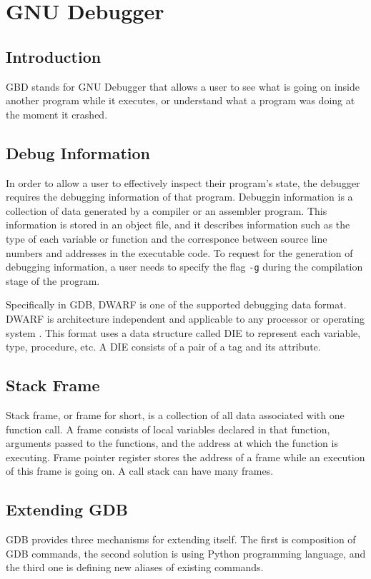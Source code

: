 \chapter{GNU Debugger} \label{GDB}
\section{Introduction}
GBD stands for GNU Debugger that allows a user to see what is going on
inside another program while it executes, or understand what a program was
doing at the moment it crashed\cite{reference3}.

\section{Debug Information}
In order to allow a user to effectively inspect their program's state, the
debugger requires the debugging information of that program. Debuggin
information is a collection of data generated by a compiler or an assembler
program. This information is stored in an object file, and it describes
information such as the type of each variable or function and
the corresponce between source line numbers and addresses in the executable
code\cite{reference6}. To request for the generation of debugging information,
a user needs to specify the flag \verb|-g| during the compilation stage of the
program.

Specifically in GDB, DWARF is one of the supported debugging data format. DWARF is architecture
independent and applicable to any processor or operating system
\cite{reference7}. This format uses a data structure called DIE to represent
each variable, type, procedure, etc. A DIE consists of a pair of a tag
and its attribute\cite{reference8}.

\section{Stack Frame}
Stack frame, or frame for short, is a collection of all data associated with
one function call. A frame consists of local variables declared in that
function, arguments passed to the functions, and the address at which the
function is executing. Frame pointer register stores the address of a frame
while an execution of this frame is going on. A call stack can have many
frames\cite{reference}.

\section{Extending GDB}
GDB provides three mechanisms for extending itself. The first is
composition of GDB commands, the second solution is using Python programming
language, and the third one is defining new aliases of existing commands.

